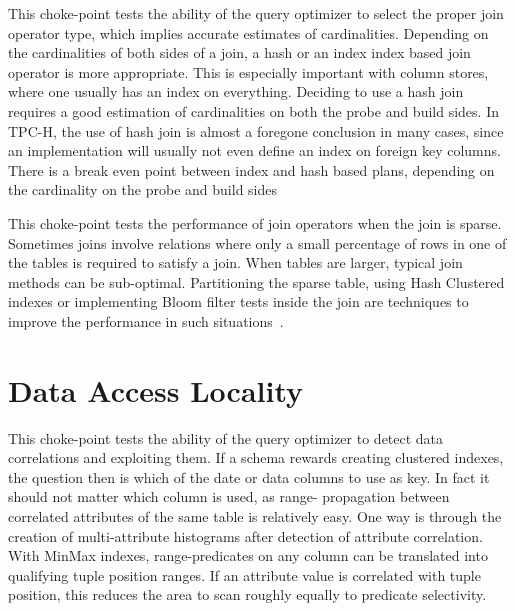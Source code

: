


This choke-point tests the ability of the query optimizer to select the proper join operator type, which implies accurate estimates of cardinalities.
Depending on the cardinalities of both sides of a join, a hash or an index index based join operator is more appropriate.
This is especially important with column stores, where one usually has an index on everything. Deciding to use a hash join requires a good estimation of cardinalities on both the probe and build sides.
In TPC-H, the use of hash join is almost a foregone conclusion in many cases, since an implementation will usually not even define an index on foreign key columns.
There is a break even point between index and hash based plans, depending on the cardinality on the probe and build sides




This choke-point tests the performance of join operators when the join is sparse. Sometimes joins involve relations where only a small percentage of rows in one of the tables is required to satisfy a join. When tables are larger, typical join methods can be sub-optimal. Partitioning the sparse table, using Hash Clustered indexes or implementing Bloom filter tests inside the join are techniques to improve the performance in such situations~\cite{DBLP:journals/csur/Graefe93}.




\section{Data Access Locality}


This choke-point tests the ability of the query optimizer to detect data correlations and exploiting them. If a schema rewards creating clustered indexes, the question then is which of the date or data columns to use as key.
In fact it should not matter which column is used, as range- propagation between correlated attributes of the same table is relatively easy. One way is through the creation of multi-attribute histograms after detection of attribute correlation.
With MinMax indexes, range-predicates on any column can be translated into qualifying tuple position ranges. If an attribute value is correlated with tuple position, this reduces the area to scan roughly equally to predicate selectivity.

